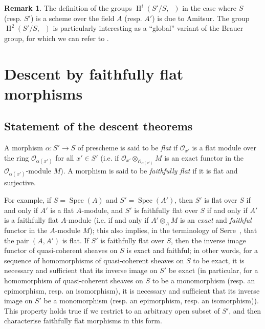 \documentclass{article}
\theoremstyle{plain}
\theoremstyle{definition}
\newenvironment{definition}[1]
  {\renewcommand\theinnercustomdefinition{#1}\innercustomdefinition}
  {\endinnercustomdefinition}
\newtheorem*{remark}{Remark}
\newcommand{\sh}[1]{{\mathscr{#1}}}
\DeclareMathOperator{\HH}{H}
\DeclareMathOperator{\Gm}{G_m}
\DeclareMathOperator{\Spec}{Spec}
\newcommand{\oldpage}[1]{\marginpar{\footnotesize$\Big\vert$ \textit{p.~#1}}}
\begin{document}
\begin{remark}
  The definition of the groups $\HH^i(S'/S,\Gm)$ in the case where $S$ (resp. $S'$) is a scheme over the field $A$ (resp. $A'$) is due to Amitsur.
  The group $\HH^2(S'/S,\Gm)$ is particularly interesting as a ``global'' variant of the Brauer group, for which we can refer to \cite[chap.~VII]{1}.
\end{remark}



\section{Descent by faithfully flat morphisms}
\label{B}

\subsection{Statement of the descent theorems}
\label{B.1}

\begin{definition}{1.1}
  A morphism $\alpha\colon S'\to S$ of prescheme is said to be \emph{flat} if $\sh{O}_{x'}$ is a flat module over the ring $\sh{O}_{\alpha(x')}$ for all $x'\in S'$ (i.e. if $\sh{O}_{x'}\otimes_{\sh{O}_{\alpha(x')}}M$ is an exact functor in the $\sh{O}_{\alpha(x')}$-module $M$).
  A morphism is said to be \emph{faithfully flat} if it is flat and surjective.
\end{definition}

For example, if $S=\Spec(A)$ and $S'=\Spec(A')$, then $S'$ is flat over $S$ if and only if $A'$ is a flat $A$-module, and $S'$ is faithfully flat over $S$ if and only if $A'$ is a faithfully flat $A$-module (i.e. if and only if $A'\otimes_A M$ is an \emph{exact} and \emph{faithful} functor in the $A$-module $M$);
this also implies, in the terminology of Serre~\cite{5}, that the pair $(A,A')$ is flat.
If $S'$ is faithfully flat over $S$, then the inverse image functor of quasi-coherent sheaves on $S$ is exact and faithful;
in other words, for a sequence of homomorphisms of
\oldpage{190-17}
quasi-coherent sheaves on $S$ to be exact, it is necessary and sufficient that its inverse image on $S'$ be exact (in particular, for a homomorphism of quasi-coherent sheaves on $S$ to be a monomorphism (resp. an epimorphism, resp. an isomorphism), it is necessary and sufficient that its inverse image on $S'$ be a monomorphism (resp. an epimorphism, resp. an isomorphism)).
This property holds true if we restrict to an arbitrary open subset of $S'$, and then characterise faithfully flat morphisms in this form.
\end{document}

